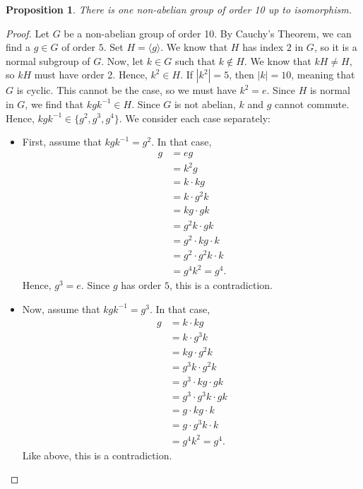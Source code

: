 \documentclass[a4paper, openany]{memoir}
\theoremstyle{definition}
\theoremstyle{plain}
\newtheorem{proposition}[definition]{Proposition}
\begin{document}
    \begin{proposition}
        There is one non-abelian group of order 10 up to isomorphism.
    \end{proposition}
    \begin{proof}
        Let $G$ be a non-abelian group of order 10. By Cauchy's Theorem, we can find a $g \in G$ of order $5$. Set $H = \langle g \rangle$. We know that $H$ has index $2$ in $G$, so it is a normal subgroup of $G$. Now, let $k \in G$ such that $k \not\in H$. We know that $kH \neq H$, so $kH$ must have order 2. Hence, $k^2 \in H$. If $|k^2| = 5$, then $|k| = 10$, meaning that $G$ is cyclic. This cannot be the case, so we must have $k^2 = e$. Since $H$ is normal in $G$, we find that $kgk^{-1} \in H$. Since $G$ is not abelian, $k$ and $g$ cannot commute. Hence, $kgk^{-1} \in \{g^2, g^3, g^4\}$. We consider each case separately:
        \begin{itemize}
            \item First, assume that $kgk^{-1} = g^2$. In that case, 
            \begin{align*}
                g &= eg \\
                &= k^2g \\
                &= k \cdot kg \\
                &= k \cdot g^2k \\
                &= kg \cdot gk \\
                &= g^2k \cdot gk \\
                &= g^2 \cdot kg \cdot k \\
                &= g^2 \cdot g^2k \cdot k \\
                &= g^4 k^2 = g^4.
            \end{align*}
            Hence, $g^3 = e$. Since $g$ has order $5$, this is a contradiction.

            \item Now, assume that $kgk^{-1} = g^3$. In that case,
            \begin{align*}
                g &= k \cdot kg \\
                &= k \cdot g^3k \\
                &= kg \cdot g^2 k \\
                &= g^3k \cdot g^2 k \\
                &= g^3 \cdot kg \cdot gk \\
                &= g^3 \cdot g^3k \cdot gk  \\
                &= g \cdot kg \cdot k \\
                &= g \cdot g^3k \cdot k \\
                &= g^4 k^2 = g^4.
            \end{align*}
            Like above, this is a contradiction.
            

\end{itemize}
\end{proof}
\end{document}
